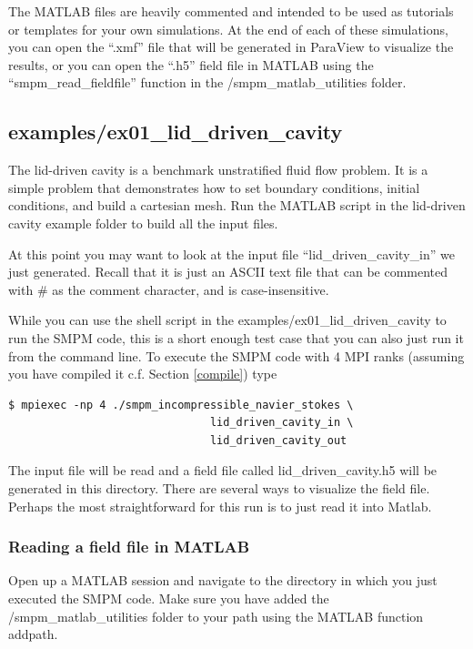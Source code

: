 \documentclass[onside]{article}
\begin{document}
The MATLAB files are heavily commented and intended to be used as tutorials or templates for your own simulations.  At the end of each of these simulations, you can open the ``.xmf'' file that will be generated in ParaView to visualize the results, or you can open the ``.h5'' field file in MATLAB using the ``smpm\_read\_fieldfile'' function in the /smpm\_matlab\_utilities folder.

\subsection{examples/ex01\_lid\_driven\_cavity}

The lid-driven cavity is a benchmark unstratified fluid flow problem.  It is a simple problem that demonstrates how to set boundary conditions, initial conditions, and build a cartesian mesh.  Run the MATLAB script in the lid-driven cavity example folder to build all the input files.

At this point you may want to look at the input file ``lid\_driven\_cavity\_in'' we just generated.  Recall that it is just an ASCII text file
that can be commented with \# as the comment character, and is case-insensitive.  

While you can use the shell script in the examples/ex01\_lid\_driven\_cavity to run the SMPM code, this is a short enough test case that you can also just run it from the command line.  To execute the SMPM code with 4 MPI ranks (assuming you have compiled it c.f. Section \ref{compile}) type
\begin{verbatim}
$ mpiexec -np 4 ./smpm_incompressible_navier_stokes \
                               lid_driven_cavity_in \
                               lid_driven_cavity_out
\end{verbatim}
The input file will be read and a field file called lid\_driven\_cavity.h5 will be generated in this directory.  There are several ways to visualize the field file.  Perhaps the most straightforward for this run is to just read it into Matlab.

\subsubsection{Reading a field file in MATLAB}

Open up a MATLAB session and navigate to the directory in which you just executed the SMPM code.  Make sure you have added the /smpm\_matlab\_utilities folder to your path using the MATLAB function addpath.
\end{document}
